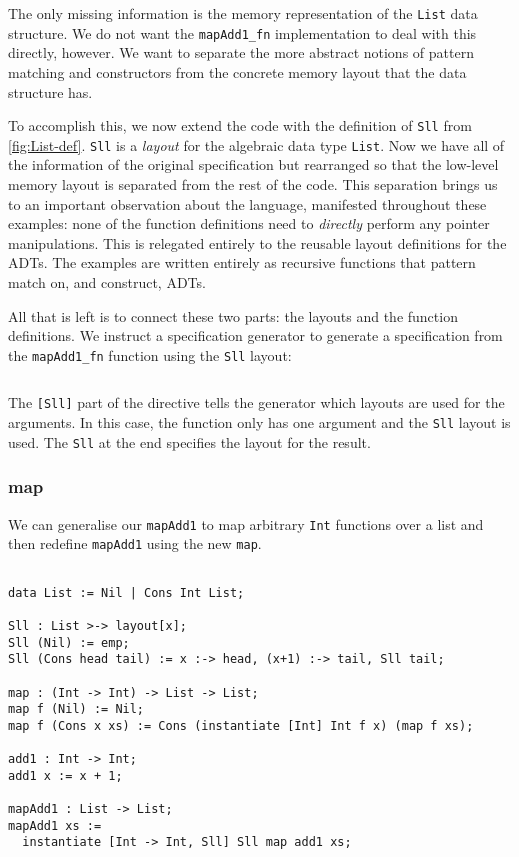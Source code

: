 \noindent
The only missing information is the memory representation of the \verb|List| data structure. We do not want the
\verb|mapAdd1_fn| implementation to deal with this directly, however. We want to separate the more abstract notions
of pattern matching and constructors from the concrete memory layout that the data structure has.

To accomplish this, we now extend the code with the definition of
\verb|Sll| from \autoref{fig:List-def}. \verb|Sll| is a
\textit{layout} for the algebraic data type \verb|List|.
%
Now we have all of the information of the original specification but
rearranged so that the low-level memory layout is separated from the
rest of the code. This separation brings us to an important
observation about the language, manifested throughout these examples:
none of the function definitions need to \emph{directly} perform any
pointer manipulations. This is relegated entirely to the reusable
layout definitions for the ADTs. The examples are written entirely as
recursive functions that pattern match on, and construct, ADTs.

All that is left is to connect these two parts: the layouts and the
function definitions. We instruct a \SuSLik{} specification generator to
generate a \SuSLik{} specification from the \verb|mapAdd1_fn| function
using the \verb|Sll| layout:
%
\begin{lstlisting}[language=Pika]
%generate mapAdd1_fn [Sll] Sll
\end{lstlisting}
%
The \verb|[Sll]| part of the directive tells the generator which
layouts are used for the arguments. In this case, the function only
has one argument and the \verb|Sll| layout is used. The \verb|Sll| at
the end specifies the layout for the result.

\subsubsection{map}

We can generalise our \verb|mapAdd1| to map arbitrary \verb|Int|
functions over a list and then redefine \verb|mapAdd1| using the new
\verb|map|.

\begin{lstlisting}[language=Pika]
%generate mapAdd1 [Sll] Sll

data List := Nil | Cons Int List;

Sll : List >-> layout[x];
Sll (Nil) := emp;
Sll (Cons head tail) := x :-> head, (x+1) :-> tail, Sll tail;

map : (Int -> Int) -> List -> List;
map f (Nil) := Nil;
map f (Cons x xs) := Cons (instantiate [Int] Int f x) (map f xs);

add1 : Int -> Int;
add1 x := x + 1;

mapAdd1 : List -> List;
mapAdd1 xs :=
  instantiate [Int -> Int, Sll] Sll map add1 xs;
\end{lstlisting}

